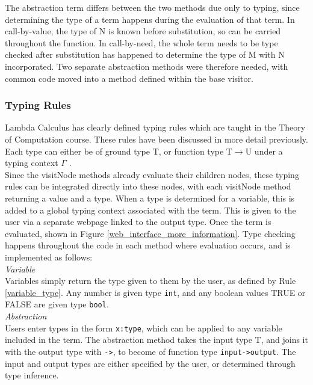 \documentclass[a4paper,11pt]{report}
\begin{document}
The abstraction term differs between the two methods due only to typing, since determining the type of a term happens during the evaluation of that term. In call-by-value, the type of N is known before substitution, so can be carried throughout the function. In call-by-need, the whole term needs to be type checked after substitution has happened to determine the type of M with N incorporated. Two separate abstraction methods were therefore needed, with common code moved into a method defined within the base visitor.

\subsubsection{Typing Rules}

Lambda Calculus has clearly defined typing rules which are taught in the Theory of Computation course. These rules have been discussed in more detail previously. Each type can either be of ground type T, or function type T$\rightarrow$U under a typing context $\Gamma$ \cite{Hankin2004}.\\

Since the visitNode methods already evaluate their children nodes, these typing rules can be integrated directly into these nodes, with each visitNode method returning a value and a type. When a type is determined for a variable, this is added to a global typing context associated with the term. This is given to the user via a separate webpage linked to the output type. Once the term is evaluated, shown in Figure \ref{web_interface_more_information}. Type checking happens throughout the code in each method where evaluation occurs, and is implemented as follows:\\

\textit{Variable}\\
Variables simply return the type given to them by the user, as defined by Rule \ref{variable_type}. Any number is given type \texttt{int}, and any boolean values TRUE or FALSE are given type \texttt{bool}.\\

\textit{Abstraction}\\
Users enter types in the form \texttt{x:type}, which can be applied to any variable included in the term. The abstraction method takes the input type T, and joins it with the output type with \texttt{->}, to become of function type \texttt{input->output}. The input and output types are either specified by the user, or determined through type inference.\\
\end{document}
